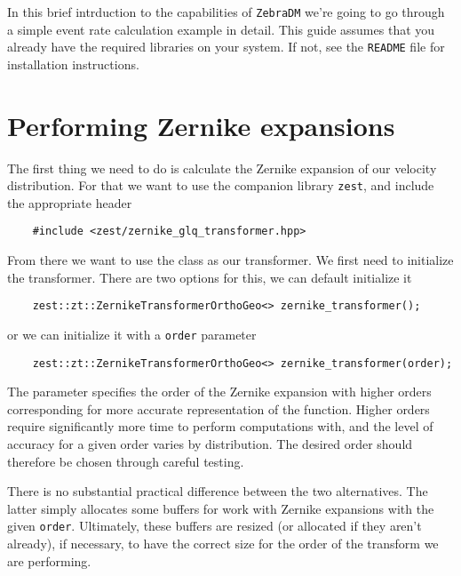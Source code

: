 \documentclass{article}
\begin{document}
In this brief intrduction to the capabilities of \texttt{ZebraDM} we're going to go through a simple event rate calculation example in detail. This guide assumes that you already have the required libraries on your system. If not, see the \texttt{README} file for installation instructions.

\section{Performing Zernike expansions}

The first thing we need to do is calculate the Zernike expansion of our velocity distribution. For that we want to use the companion library \texttt{zest}, and include the appropriate header
\begin{verbatim}
    #include <zest/zernike_glq_transformer.hpp>
\end{verbatim}
From there we want to use the class  as our transformer. We first need to initialize the transformer. There are two options for this, we can default initialize it
\begin{verbatim}
    zest::zt::ZernikeTransformerOrthoGeo<> zernike_transformer();
\end{verbatim}
or we can initialize it with a \texttt{order} parameter
\begin{verbatim}
    zest::zt::ZernikeTransformerOrthoGeo<> zernike_transformer(order);
\end{verbatim}
The parameter  specifies the order of the Zernike expansion with higher orders corresponding for more accurate representation of the function. Higher orders require significantly more time to perform computations with, and the level of accuracy for a given order varies by distribution. The desired order should therefore be chosen through careful testing.

There is no substantial practical difference between the two alternatives. The latter simply allocates some buffers for work with Zernike expansions with the given \texttt{order}. Ultimately, these buffers are resized (or allocated if they aren't already), if necessary, to have the correct size for the order of the transform we are performing.
\end{document}
